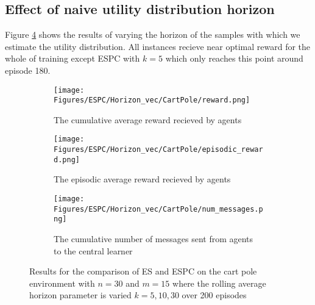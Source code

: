 \subsection{Effect of naive utility distribution horizon}

Figure \ref{fig:CPHorizon} shows the results of varying the horizon of the samples with which we estimate the utility distribution. All instances recieve near optimal reward for the whole of training except ESPC with $k=5$ which only reaches this point around episode 180.

\begin{figure}
    \centering
    \begin{subfigure}{0.5\textwidth}
        \centering
        \texttt{[image: Figures/ESPC/Horizon\_vec/CartPole/reward.png]}
        \caption{The cumulative average reward recieved by agents}
        \label{fig:HorizonReward}
    \end{subfigure}
    \begin{subfigure}{0.5\textwidth}
        \centering
        \texttt{[image: Figures/ESPC/Horizon\_vec/CartPole/episodic\_reward.png]}
        \caption{The episodic average reward recieved by agents}
        \label{fig:HorizonEpisodicReward}
    \end{subfigure}
    \begin{subfigure}{0.5\textwidth}
        \centering
        \texttt{[image: Figures/ESPC/Horizon\_vec/CartPole/num\_messages.png]}
        \caption{The cumulative number of messages sent from agents to the central learner}
        \label{fig:HorizonMessages}
    \end{subfigure}
    \caption{Results for the comparison of ES and ESPC on the cart pole environment with $n=30$ and $m=15$ where the rolling average horizon parameter is varied $k=5,10,30$ over 200 episodes}
    \label{fig:CPHorizon}
\end{figure}


